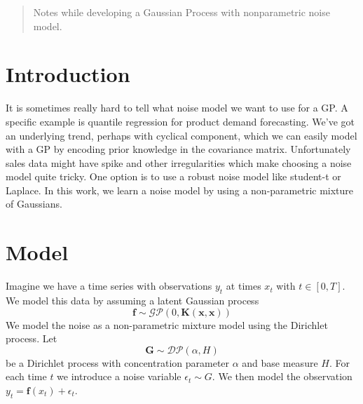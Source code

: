 \documentclass{article}
\newcommand{\GP}[2]{\mathcal{GP}\left({#1},{#2}\right)}
\newcommand{\DP}[2]{\mathcal{DP}\left({#1},{#2}\right)}
\begin{document}
 


\begin{abstract} 
Notes while developing a Gaussian Process with nonparametric noise model.
\end{abstract} 

\section{Introduction}
\label{intro}

It is sometimes really hard to tell what noise model we want to use for a GP. A specific example is quantile regression for product demand forecasting. We've got an underlying trend, perhaps with cyclical component, which we can easily model with a GP by encoding prior knowledge in the covariance matrix. Unfortunately sales data might have spike and other irregularities which make choosing a noise model quite tricky. One option is to use a robust noise model like student-t or Laplace. In this work, we learn a noise model by using a non-parametric mixture of Gaussians.



\section{Model}
\label{model}

Imagine we have a time series with observations $y_t$ at times $x_t$ with $t \in [0,T]$. We model this data by assuming a latent Gaussian process
\begin{equation}
\bm{f} \sim \GP{0}{\bm{K}(\bm{x},\bm{x})}
\end{equation}
We model the noise as a non-parametric mixture model using the Dirichlet process. Let
\begin{equation}
\bm{G} \sim \DP{\alpha}{H}
\end{equation}
be a Dirichlet process with concentration parameter $\alpha$ and base measure $H$. For each time $t$ we introduce a noise variable $\epsilon_t \sim G$. We then model the observation $y_t = \bm{f}(x_t) + \epsilon_t$.
\end{document}

